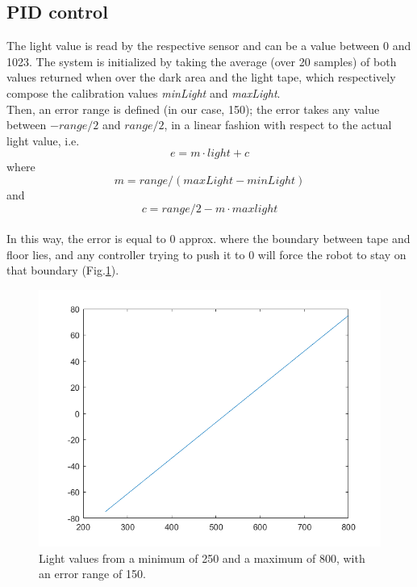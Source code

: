 \documentclass[a4paper,11pt,oneside]{book}
\begin{document}
			\subsection{PID control}
			The light value is read by the respective sensor and can be a value between 0 and 1023.
			The system is initialized by taking the average (over 20 samples) of both values returned when over the dark area and the light tape, which respectively compose the calibration values \emph{minLight} and \emph{maxLight}.\\
			Then, an error range is defined (in our case, 150); the error takes any value between $-range/2$ and $range/2$, in a linear fashion with respect to the actual light value, i.e. $$e=m\cdot \mathit{light}+c$$ where $$m=\mathit{range}/(\mathit{maxLight-minLight})$$ and $$c=\mathit{range}/2-m\cdot \mathit{maxlight}$$\\
			In this way, the error is equal to 0 approx. where the boundary between tape and floor lies, and any controller trying to push it to 0 will force the robot to stay on that boundary (Fig.\ref{fig:lightError.png}).\\
			\begin{figure} [H]
				\centering
				\includegraphics[scale=0.45]{figs/lightError.png}
				\caption{Light values from a minimum of 250 and a maximum of 800, with an error range of 150.}\label{fig:lightError.png}
			\end{figure}
			
\end{document}
